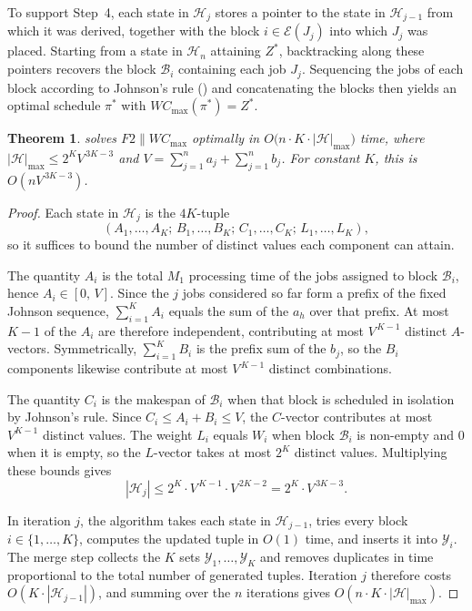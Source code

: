 ﻿\documentclass[12pt]{article}
\newtheorem{theorem}{Theorem}[section]
\begin{document}
\begin{sloppypar}
To support Step~4, each state in $\mathscr{H}_j$ stores a pointer to the state in $\mathscr{H}_{j-1}$
from which it was derived, together with the block $i \in \mathcal{E}(J_j)$ into which $J_j$ was
placed. Starting from a state in $\mathscr{H}_n$ attaining $Z^{*}$, backtracking along these pointers
recovers the block $\mathcal{B}_i$ containing each job $J_j$. Sequencing the jobs of each block
according to Johnson's rule () and concatenating the blocks then yields
an optimal schedule $\pi^{*}$ with $W C_{\max}(\pi^{*}) = Z^{*}$.

\begin{theorem}\label{thm:complexity}
 solves $F2 \parallel WC_{\max}$ optimally in
$O\bigl(n \cdot K \cdot |\mathscr{H}|_{\max}\bigr)$ time, where
$|\mathscr{H}|_{\max} \le 2^{K}V^{\,3K-3}$ and $V = \sum_{j=1}^{n}a_j + \sum_{j=1}^{n}b_j$.
For constant $K$, this is $O(nV^{\,3K-3})$.
\end{theorem}

\begin{proof}
Each state in $\mathscr{H}_j$ is the $4K$-tuple
\[
(A_1,\dots,A_K;\, B_1,\dots,B_K;\, C_1,\dots,C_K;\, L_1,\dots,L_K),
\]
so it suffices to bound the number of distinct values each component can attain.

The quantity $A_i$ is the total $M_1$ processing time of the jobs assigned to block
$\mathcal{B}_i$, hence $A_i \in [0,\,V]$. Since the $j$ jobs considered so far form a prefix of the
fixed Johnson sequence, $\sum_{i=1}^{K} A_i$ equals the sum of the $a_h$ over that prefix. At most
$K-1$ of the $A_i$ are therefore independent, contributing at most $V^{\,K-1}$ distinct
$A$-vectors. Symmetrically, $\sum_{i=1}^{K} B_i$ is the prefix sum of the $b_j$, so the $B_i$
components likewise contribute at most $V^{\,K-1}$ distinct combinations.

The quantity $C_i$ is the makespan of $\mathcal{B}_i$ when that block is scheduled in isolation by
Johnson's rule. Since $C_i \le A_i + B_i \le V$, the $C$-vector contributes at most $V^{K-1}$
distinct values. The weight $L_i$ equals $W_i$ when block $\mathcal{B}_i$ is non-empty and $0$ when
it is empty, so the $L$-vector takes at most $2^K$ distinct values. Multiplying these bounds gives
\[
|\mathscr{H}_{j}| \le 2^K \cdot V^{\,K-1} \cdot V^{\,2K-2} = 2^K \cdot V^{\,3K-3}.
\]

In iteration $j$, the algorithm takes each state in $\mathscr{H}_{j-1}$, tries every block
$i \in \{1,\dots,K\}$, computes the updated tuple in $O(1)$ time, and inserts it into
$\mathcal{Y}_i$. The merge step collects the $K$ sets $\mathcal{Y}_1,\dots,\mathcal{Y}_K$ and removes
duplicates in time proportional to the total number of generated tuples. Iteration $j$ therefore
costs $O(K \cdot |\mathscr{H}_{j-1}|)$, and summing over the $n$ iterations gives
$O(n \cdot K \cdot |\mathscr{H}|_{\max})$.


\end{proof}
\end{sloppypar}
\end{document}
